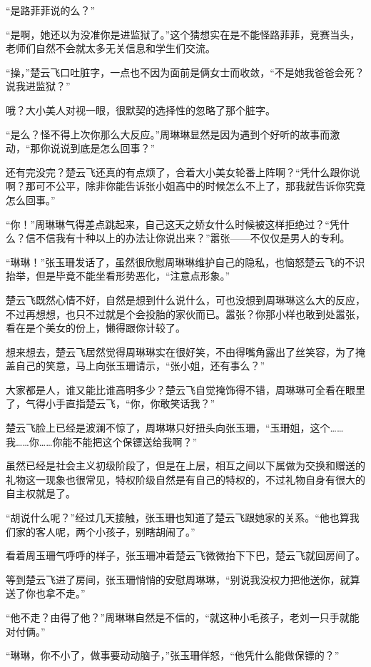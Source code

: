 “是路菲菲说的么？”

“是啊，她还以为没准你是进监狱了。”这个猜想实在是不能怪路菲菲，竞赛当头，老师们自然不会就太多无关信息和学生们交流。

“操，”楚云飞口吐脏字，一点也不因为面前是俩女士而收敛，“不是她我爸爸会死？说我进监狱？”

哦？大小美人对视一眼，很默契的选择性的忽略了那个脏字。

“是么？怪不得上次你那么大反应。”周琳琳显然是因为遇到个好听的故事而激动，“那你说说到底是怎么回事？”

还有完没完？楚云飞还真的有点烦了，合着大小美女轮番上阵啊？“凭什么跟你说啊？那可不公平，除非你能告诉张小姐高中的时候怎么不上了，那我就告诉你究竟怎么回事。”

“你！”周琳琳气得差点跳起来，自己这天之娇女什么时候被这样拒绝过？“凭什么？信不信我有十种以上的办法让你说出来？”嚣张——不仅仅是男人的专利。

“琳琳！”张玉珊发话了，虽然很欣慰周琳琳维护自己的隐私，也恼怒楚云飞的不识抬举，但是毕竟不能坐看形势恶化，“注意点形象。”

楚云飞既然心情不好，自然是想到什么说什么，可也没想到周琳琳这么大的反应，不过再想想，也只不过就是个会投胎的家伙而已。嚣张？你那小样也敢到处嚣张，看在是个美女的份上，懒得跟你计较了。

想来想去，楚云飞居然觉得周琳琳实在很好笑，不由得嘴角露出了丝笑容，为了掩盖自己的笑意，马上向张玉珊请示，“张小姐，还有事么？”

大家都是人，谁又能比谁高明多少？楚云飞自觉掩饰得不错，周琳琳可全看在眼里了，气得小手直指楚云飞，“你，你敢笑话我？”

楚云飞脸上已经是波澜不惊了，周琳琳只好扭头向张玉珊，“玉珊姐，这个……我……你……你能不能把这个保镖送给我啊？”

虽然已经是社会主义初级阶段了，但是在上层，相互之间以下属做为交换和赠送的礼物这一现象也很常见，特权阶级自然是有自己的特权的，不过礼物自身有很大的自主权就是了。

“胡说什么呢？”经过几天接触，张玉珊也知道了楚云飞跟她家的关系。“他也算我们家的客人呢，两个小孩子，别瞎胡闹了。”

看着周玉珊气呼呼的样子，张玉珊冲着楚云飞微微抬下下巴，楚云飞就回房间了。

等到楚云飞进了房间，张玉珊悄悄的安慰周琳琳，“别说我没权力把他送你，就算送了你也拿不走。”

“他不走？由得了他？”周琳琳自然是不信的，“就这种小毛孩子，老刘一只手就能对付俩。”

“琳琳，你不小了，做事要动动脑子，”张玉珊佯怒，“他凭什么能做保镖的？”

